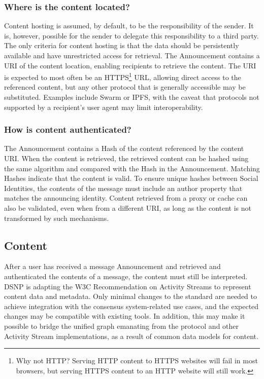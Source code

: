 \documentclass[12pt,letterpaper]{article}
\begin{document}
\subsubsection{Where is the content located?}

Content hosting is assumed, by default, to be the responsibility of the sender. It is,
however, possible for the sender to delegate this responsibility to a third party. The only
criteria for content hosting is that the data should be persistently available and have
unrestricted access for retrieval. The Announcement contains a URI of the content location,
enabling recipients to retrieve the content. The URI is expected to most often be an
HTTPS\footnote{Why not HTTP? Serving HTTP content to HTTPS websites will fail in most
  browsers, but serving HTTPS content to an HTTP website will still work.} URL, allowing
direct access to the referenced content, but any other protocol that is generally accessible
may be substituted. Examples include Swarm or IPFS, with the caveat that protocols not
supported by a recipient's user agent may limit interoperability.

\subsubsection{How is content authenticated?}

The Announcement contains a Hash of the content referenced by the content URI. When the
content is retrieved, the retrieved content can be hashed using the same algorithm and
compared with the Hash in the Announcement. Matching Hashes indicate that the content is
valid. To ensure unique hashes between Social Identities, the contents of the message must
include an author property that matches the announcing identity. Content retrieved from a
proxy or cache can also be validated, even when from a different URI, as long as the content
is not transformed by such mechanisms.

\subsection{Content}\label{sec:content}

After a user has received a message Announcement and retrieved and authenticated the
contents of a message, the content must still be interpreted. DSNP is adapting the W3C
Recommendation on Activity Streams\cite{activitypub} to represent content data and
metadata. Only minimal changes to the standard are needed to achieve integration with the
consensus system-related use cases, and the expected changes may be compatible with existing
tools. In addition, this may make it possible to bridge the unified graph emanating from the
protocol and other Activity Stream implementations, as a result of common data models for
content.
\end{document}

